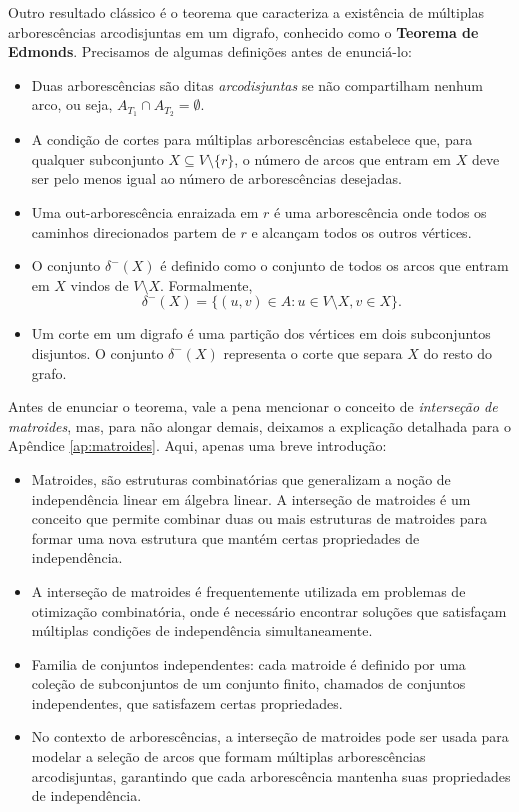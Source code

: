 Outro resultado clássico é o teorema que caracteriza a existência de múltiplas arborescências arcodisjuntas em um digrafo, conhecido como o \textbf{Teorema de Edmonds}. Precisamos de algumas definições antes de enunciá-lo:

\begin{itemize}
	\item Duas arborescências são ditas \emph{arcodisjuntas} se não compartilham nenhum arco, ou seja, \(A_{T_1} \cap A_{T_2} = \emptyset\).
	\item A condição de cortes para múltiplas arborescências estabelece que, para qualquer subconjunto \(X \subseteq V \setminus \{r\}\), o número de arcos que entram em \(X\) deve ser pelo menos igual ao número de arborescências desejadas.
	\item Uma out-arborescência enraizada em \(r\) é uma arborescência onde todos os caminhos direcionados partem de \(r\) e alcançam todos os outros vértices.
	\item O conjunto \(\delta^-(X)\) é definido como o conjunto de todos os arcos que entram em \(X\) vindos de \(V \setminus X\). Formalmente,
	      \[
		      \delta^-(X) = \{(u, v) \in A : u \in V \setminus X, v \in X\}.
	      \]
	\item Um corte em um digrafo é uma partição dos vértices em dois subconjuntos disjuntos. O conjunto \(\delta^-(X)\) representa o corte que separa \(X\) do resto do grafo.
\end{itemize}


Antes de enunciar o teorema, vale a pena mencionar o conceito de \emph{interseção de matroides}, mas, para não alongar demais, deixamos a explicação detalhada para o Apêndice \ref{ap:matroides}. Aqui, apenas uma breve introdução:
\begin{itemize}
	\item Matroides, são estruturas combinatórias que generalizam a noção de independência linear em álgebra linear. A interseção de matroides é um conceito que permite combinar duas ou mais estruturas de matroides para formar uma nova estrutura que mantém certas propriedades de independência.
	\item A interseção de matroides é frequentemente utilizada em problemas de otimização combinatória, onde é necessário encontrar soluções que satisfaçam múltiplas condições de independência simultaneamente.
	\item Familia de conjuntos independentes: cada matroide é definido por uma coleção de subconjuntos de um conjunto finito, chamados de conjuntos independentes, que satisfazem certas propriedades.
	\item No contexto de arborescências, a interseção de matroides pode ser usada para modelar a seleção de arcos que formam múltiplas arborescências arcodisjuntas, garantindo que cada arborescência mantenha suas propriedades de independência.
\end{itemize}



